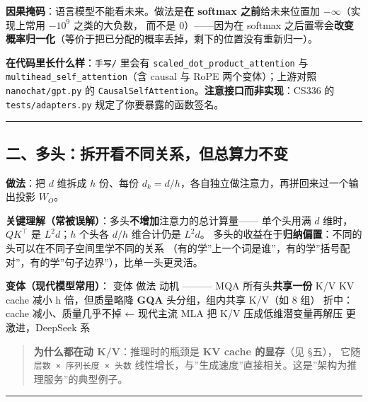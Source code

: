 \documentclass[
  chinese,
  11pt,
]{ctexart}
\begin{document}
\textbf{因果掩码}：语言模型不能看未来。做法是\textbf{在 softmax 之前}给未来位置加 \(-\infty\)（实现上常用 \(-10^9\) 之类的大负数， 而不是 0）------因为在 softmax 之后置零会\textbf{改变概率归一化}（等价于把已分配的概率丢掉，剩下的位置没有重新归一）。

\textbf{在代码里长什么样}：\texttt{手写/} 里会有 \texttt{scaled\_dot\_product\_attention} 与 \texttt{multihead\_self\_attention}（含 causal 与 RoPE 两个变体）；上游对照 \texttt{nanochat/gpt.py} 的 \texttt{CausalSelfAttention}。\textbf{注意接口而非实现}：CS336 的 \texttt{tests/adapters.py} 规定了你要暴露的函数签名。

\begin{center}\rule{0.5\linewidth}{0.5pt}\end{center}

\subsection{二、多头：拆开看不同关系，但总算力不变}\label{ux4e8cux591aux5934ux62c6ux5f00ux770bux4e0dux540cux5173ux7cfbux4f46ux603bux7b97ux529bux4e0dux53d8}

\textbf{做法}：把 \(d\) 维拆成 \(h\) 份、每份 \(d_k = d/h\)，各自独立做注意力，再拼回来过一个输出投影 \(W_O\)。

\textbf{关键理解（常被误解）}：多头\textbf{不增加}注意力的总计算量------ 单个头用满 \(d\) 维时，\(QK^\top\) 是 \(L^2 d\)；\(h\) 个头各 \(d/h\) 维合计仍是 \(L^2 d\)。 多头的收益在于\textbf{归纳偏置}：不同的头可以在不同子空间里学不同的关系 （有的学''上一个词是谁''，有的学''括号配对''，有的学''句子边界''），比单一头更灵活。

\textbf{变体（现代模型常用）}： \textbar{} 变体 \textbar{} 做法 \textbar{} 动机 \textbar{} \textbar---\textbar---\textbar---\textbar{} \textbar{} MQA \textbar{} 所有头\textbf{共享一份} K/V \textbar{} KV cache 减小 h 倍，但质量略降 \textbar{} \textbar{} \textbf{GQA} \textbar{} 头分组，组内共享 K/V（如 8 组） \textbar{} 折中：cache 减小、质量几乎不掉 ← 现代主流 \textbar{} \textbar{} MLA \textbar{} 把 K/V 压成低维潜变量再解压 \textbar{} 更激进，DeepSeek 系 \textbar{}

\begin{quote}
\textbf{为什么都在动 K/V}：推理时的瓶颈是 \textbf{KV cache 的显存}（见 §五）， 它随 \texttt{层数\ ×\ 序列长度\ ×\ 头数} 线性增长，与''生成速度''直接相关。这是''架构为推理服务''的典型例子。
\end{quote}

\begin{center}\rule{0.5\linewidth}{0.5pt}\end{center}
\end{document}
